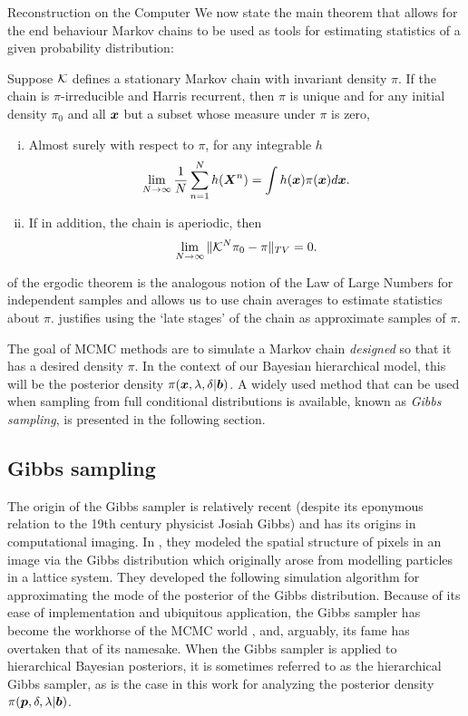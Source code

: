 \begin{chapter}{Reconstruction on the Computer}
We now state the main theorem that allows for the end behaviour Markov chains to be used as tools for estimating statistics of a given probability distribution:
\begin{thm} \label{thm:ergodicTheorem}
  \citep{tierney1994markov} Suppose $\mathcal K$ defines a stationary Markov chain with invariant density $\pi$. If the chain is $\pi$-irreducible and Harris recurrent, then $\pi$ is unique and for any initial density $\pi_0$ and all $\mbox{\boldmath$x$}$ but a subset whose measure under $\pi$ is zero,
  \begin{enumerate}[(i)]
    \item Almost surely with respect to $\pi$, for any integrable $h$ \begin{equation} \lim_{N\to \infty}\frac 1N\sum_{n=1}^N h(\mbox{\boldmath$X$}^n) = \int h(\mbox{\boldmath$x$}) \pi(\mbox{\boldmath$x$}) d\mbox{\boldmath$x$}. \label{eq:ergodicStat}\end{equation}
    \item If in addition, the chain is aperiodic, then \begin{equation} \lim_{N\to \infty}\|\mathcal K^N\pi_0 - \pi\|_{TV} = 0. \label{eq:ergodicDist}\end{equation}
  \end{enumerate}
\end{thm}
 of the ergodic theorem  is the analogous notion of the Law of Large Numbers for independent samples and allows us to use chain averages to estimate statistics about $\pi$.  
 justifies using the `late stages' of the chain as approximate samples of $\pi$.

The goal of MCMC methods are to simulate a Markov chain \emph{designed} so that it has a desired density $\pi$.  
In the context of our Bayesian hierarchical model, this will be the posterior density $\pi(\mbox{\boldmath$x$}, \lambda, \delta| \mbox{\boldmath$b$})$.
A widely used method that can be used when sampling from full conditional distributions is available, known as \emph{Gibbs sampling}, is presented in the following section.

\subsection{Gibbs sampling}

The origin of the Gibbs sampler is relatively recent (despite its eponymous relation to the 19th century physicist Josiah Gibbs) and has its origins in computational imaging. 
In \citep{geman1984stochastic}, they modeled the spatial structure of pixels in an image via the Gibbs distribution which originally arose from modelling particles in a lattice system.
They developed the following simulation algorithm for approximating the mode of the posterior of the Gibbs distribution.
Because of its ease of implementation and ubiquitous application, the Gibbs sampler has become the workhorse of the MCMC world \citep{robert2013monte}, and, arguably, its fame has overtaken that of its namesake.
When the Gibbs sampler is applied to hierarchical Bayesian posteriors, it is sometimes referred to as the hierarchical Gibbs sampler, as is the case in this work for analyzing the posterior density $\pi(\mbox{\boldmath$p$},\delta,\lambda|\mbox{\boldmath$b$})$.



\end{chapter}
